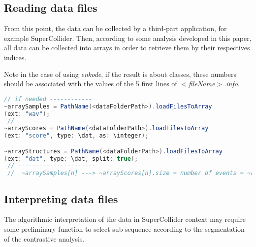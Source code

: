 \subsection{Reading data files}
\label{rdf}

From this point, the data can be collected by a third-part application, for example SuperCollider. Then, according to some analysis developed in this paper, all data can be collected into arrays in order to retrieve them by their respectives indices.

Note in the case of using \textsl{enkode}, if the result is about classes, these numbers should be associated with the values of the 5 first lines of \textsl{$<$fileName$>$.info}.

\smallskip

 \begin{lstlisting}[basicstyle=\footnotesize\ttfamily,language=Java] 
 // if needed ------------
~arraySamples = PathName(<dataFolderPath>).loadFilesToArray
(ext: "wav");
 // ----------------------
~arrayScores = PathName(<dataFolderPath>).loadFilesToArray
(ext: "score", type: \dat, as: \integer);

~arrayStructures = PathName(<dataFolderPath>).loadFilesToArray
(ext: "dat", type: \dat, split: true);
 // ----------------------
 //  ~arraySamples[n] ---> ~arrayScores[n].size = number of events = ~arrayStructures[n].sum{|subAr| subAr.size}
\end{lstlisting}  

\subsection{Interpreting data files}
\label{idf}

The algorithmic interpretation of the data in SuperCollider context may require some preliminary function to select sub-sequence according to the segmentation of the contrastive analysis. 

